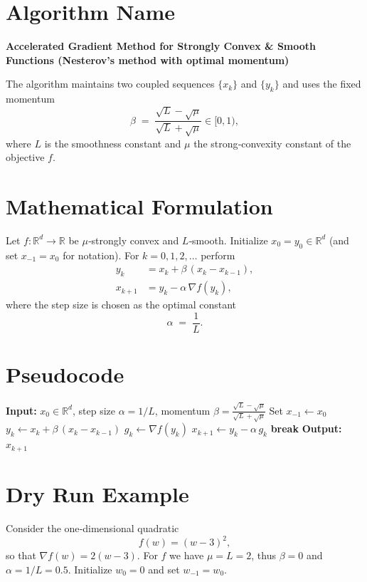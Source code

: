 \documentclass{article}
\newcommand{\grad}{\nabla}
\newcommand{\R}{\mathbb{R}}
\begin{document}
\section*{Algorithm Name}
\textbf{Accelerated Gradient Method for Strongly Convex \& Smooth Functions (Nesterov’s method with optimal momentum)}  

The algorithm maintains two coupled sequences $\{x_k\}$ and $\{y_k\}$ and uses the fixed momentum
\[
\beta \;=\; \frac{\sqrt{L}-\sqrt{\mu}}{\sqrt{L}+\sqrt{\mu}}\in[0,1),
\]
where $L$ is the smoothness constant and $\mu$ the strong‑convexity constant of the objective $f$.

\section*{Mathematical Formulation}
Let $f:\R^d\to\R$ be $\mu$‑strongly convex and $L$‑smooth.  
Initialize $x_0=y_0\in\R^d$ (and set $x_{-1}=x_0$ for notation).  
For $k=0,1,2,\dots$ perform
\begin{align}
y_k &= x_k + \beta\,(x_k-x_{k-1}), \label{eq:y}\\
x_{k+1} &= y_k - \alpha\,\grad f(y_k), \label{eq:x}
\end{align}
where the step size is chosen as the optimal constant
\[
\alpha \;=\; \frac{1}{L}.
\]

\section*{Pseudocode}
\begin{algorithm}[H]
\caption{Accelerated Gradient for $\mu$‑strongly convex $L$‑smooth $f$}
\begin{algorithmic}[1]
\State \textbf{Input:} $x_0\in\R^d$, step size $\alpha=1/L$, momentum $\beta=\frac{\sqrt{L}-\sqrt{\mu}}{\sqrt{L}+\sqrt{\mu}}$
\State Set $x_{-1}\gets x_0$
    \State $y_k \gets x_k + \beta\,(x_k-x_{k-1})$ \hfill{}
    \State $g_k \gets \grad f(y_k)$
    \State $x_{k+1} \gets y_k - \alpha\, g_k$ \hfill{}
        \State \textbf{break}
    \EndIf
\EndFor
\State \textbf{Output:} $x_{k+1}$
\end{algorithmic}
\end{algorithm}

\section*{Dry Run Example}
Consider the one‑dimensional quadratic 
\[
f(w)=(w-3)^2,
\]
so that $\grad f(w)=2(w-3)$.  
For $f$ we have $\mu=L=2$, thus $\beta=0$ and $\alpha=1/L=0.5$.  
Initialize $w_0=0$ and set $w_{-1}=w_0$.
\end{document}
